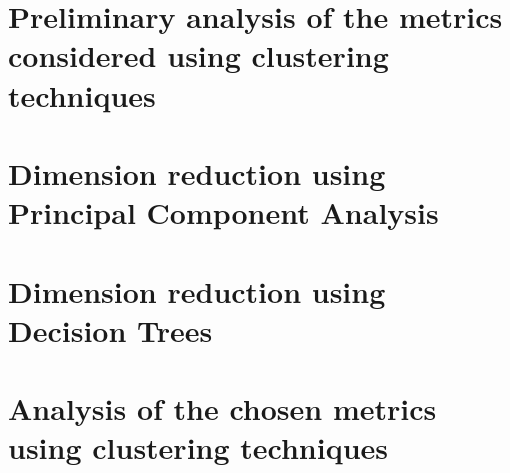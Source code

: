\section{Preliminary analysis of the metrics considered using clustering techniques}\label{sect:clust1}


\section{Dimension reduction using Principal Component Analysis}\label{sect:pca}


\section{Dimension reduction using Decision Trees}\label{sect:dectrees}


\section{Analysis of the chosen metrics using clustering techniques}\label{sect:clust2}
